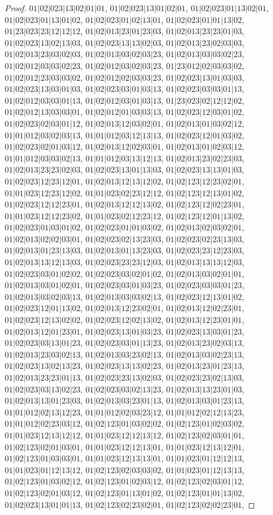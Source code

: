 \documentclass[12pt]{article}
\theoremstyle{plain}
\theoremstyle{definition}
\theoremstyle{remark}
\begin{document}
\begin{proof}
$01|02|023|13|02|01|01$, $01|02|023|13|01|02|01$, $01|02|023|01|13|02|01$, $01|02|023|01|13|01|02$, $01|02|023|01|02|13|01$, $01|02|023|01|01|13|02$, $01|23|023|23|12|12|12$, $01|02|013|23|01|23|03$, $01|02|013|23|23|01|03$, $01|02|023|13|02|13|03$, $01|02|023|13|13|02|03$, $01|02|013|23|02|03|03$, $01|02|013|23|03|02|03$, $01|02|013|03|02|03|23$, $01|02|013|03|03|02|23$, $01|02|012|03|03|02|23$, $01|02|012|03|02|03|23$, $01|23|012|02|03|03|02$, $01|02|012|23|03|03|02$, $01|02|012|02|03|03|23$, $01|02|023|13|01|03|03$, $01|02|023|13|03|01|03$, $01|02|023|03|01|03|13$, $01|02|023|03|03|01|13$, $01|02|012|03|03|01|13$, $01|02|012|03|01|03|13$, $01|23|023|02|12|12|02$, $01|02|012|13|03|03|01$, $01|02|012|01|03|03|13$, $01|02|023|12|03|01|02$, $01|02|023|02|03|01|12$, $01|02|013|12|03|02|01$, $01|02|013|01|03|02|12$, $01|01|012|03|02|03|13$, $01|01|012|03|12|13|13$, $01|02|023|12|01|03|02$, $01|02|023|02|01|03|12$, $01|02|013|12|02|03|01$, $01|02|013|01|02|03|12$, $01|01|012|03|03|02|13$, $01|01|012|03|13|12|13$, $01|02|013|23|02|23|03$, $01|02|013|23|23|02|03$, $01|02|023|13|01|13|03$, $01|02|023|13|13|01|03$, $01|02|023|12|23|12|01$, $01|02|013|12|13|12|02$, $01|02|123|12|23|02|01$, $01|01|023|12|23|12|02$, $01|01|023|02|23|12|12$, $01|02|123|12|13|01|02$, $01|02|023|12|12|23|01$, $01|02|013|12|12|13|02$, $01|02|123|12|02|23|01$, $01|01|023|12|12|23|02$, $01|01|023|02|12|23|12$, $01|02|123|12|01|13|02$, $01|02|023|01|03|01|02$, $01|02|023|01|01|03|02$, $01|02|013|02|03|02|01$, $01|02|013|02|02|03|01$, $01|02|023|02|13|23|03$, $01|02|023|02|23|13|03$, $01|02|013|01|23|13|03$, $01|02|013|01|13|23|03$, $01|02|023|23|12|23|03$, $01|02|013|13|12|13|03$, $01|02|023|23|23|12|03$, $01|02|013|13|13|12|03$, $01|02|023|03|01|02|02$, $01|02|023|03|02|01|02$, $01|02|013|03|02|01|01$, $01|02|013|03|01|02|01$, $01|02|023|03|01|03|23$, $01|02|023|03|03|01|23$, $01|02|013|03|02|03|13$, $01|02|013|03|03|02|13$, $01|02|023|12|13|01|02$, $01|02|023|12|01|13|02$, $01|02|013|12|23|02|01$, $01|02|013|12|02|23|01$, $01|02|023|12|13|02|02$, $01|02|023|12|02|13|02$, $01|02|013|12|23|01|01$, $01|02|013|12|01|23|01$, $01|02|023|13|01|03|23$, $01|02|023|13|03|01|23$, $01|02|023|03|13|01|23$, $01|02|023|03|01|13|23$, $01|02|013|23|02|03|13$, $01|02|013|23|03|02|13$, $01|02|013|03|23|02|13$, $01|02|013|03|02|23|13$, $01|02|023|13|02|13|23$, $01|02|023|13|13|02|23$, $01|02|013|23|01|23|13$, $01|02|013|23|23|01|13$, $01|02|023|23|13|02|03$, $01|02|023|23|02|13|03$, $01|02|023|03|13|02|23$, $01|02|023|03|02|13|23$, $01|02|013|13|23|01|03$, $01|02|013|13|01|23|03$, $01|02|013|03|23|01|13$, $01|02|013|03|01|23|13$, $01|01|012|02|13|12|23$, $01|01|012|02|03|23|12$, $01|01|012|02|12|13|23$, $01|01|012|02|23|03|12$, $01|02|123|01|03|02|02$, $01|02|123|01|02|03|02$, $01|01|023|12|13|12|12$, $01|01|023|12|12|13|12$, $01|02|123|02|03|01|01$, $01|02|123|02|01|03|01$, $01|01|023|12|12|13|01$, $01|01|023|12|13|12|01$, $01|02|123|01|03|03|01$, $01|01|023|12|13|13|01$, $01|01|023|01|12|12|13$, $01|01|023|01|12|13|12$, $01|02|123|02|03|03|02$, $01|01|023|01|12|13|13$, $01|02|123|01|03|02|12$, $01|02|123|01|02|03|12$, $01|02|123|02|03|01|12$, $01|02|123|02|01|03|12$, $01|02|123|01|13|01|02$, $01|02|123|01|01|13|02$, $01|02|023|13|01|01|13$, $01|02|123|02|23|02|01$, $01|02|123|02|02|23|01$, 
\end{proof}
\end{document}
